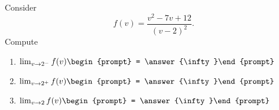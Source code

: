 \documentclass{ximera}
\author{Bart Snapp}
\begin{document}
\begin{exercise}
Consider 
\[
f(v) = \frac{v^2-7 v+12}{(v-2)^2}.
\]
Compute
\begin{enumerate}
\item $\lim_{v\to 2^- } f(v) \begin{prompt} = \answer{\infty}\end{prompt}$
\item $\lim_{v\to 2^+ } f(v) \begin{prompt} = \answer{\infty}\end{prompt}$
\item $\lim_{v\to 2 } f(v) \begin{prompt} = \answer{\infty}\end{prompt}$
\end{enumerate}
\end{exercise}
\end{document}
